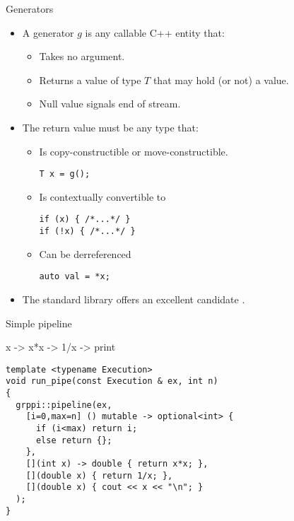 \begin{frame}[t,fragile]{Generators}
\begin{itemize}
  \item A generator $g$ is any callable C++ entity that:
    \begin{itemize}
      \item Takes no argument.
      \item Returns a value of type $T$ that may hold (or not) a value.
      \item Null value signals end of stream.
    \end{itemize}

  \vfill\pause
  \item The return value must be any type that:
    \begin{itemize}
      \item Is copy-constructible or move-constructible.
\begin{lstlisting}
T x = g();
\end{lstlisting}
      \pause
      \item Is contextually convertible to 
\begin{lstlisting}
if (x) { /*...*/ }
if (!x) { /*...*/ }
\end{lstlisting}
      \pause
      \item Can be derreferenced
\begin{lstlisting}
auto val = *x;
\end{lstlisting}
    \end{itemize}
  \vfill\pause
  \item The standard library offers an excellent candidate .
\end{itemize}
\end{frame}

\begin{frame}[t,fragile]{Simple pipeline}
\begin{block}{x -> x*x -> 1/x -> print}
\begin{lstlisting}
template <typename Execution>
void run_pipe(const Execution & ex, int n)
{
  grppi::pipeline(ex,
    [i=0,max=n] () mutable -> optional<int> {
      if (i<max) return i;
      else return {};
    },
    [](int x) -> double { return x*x; },
    [](double x) { return 1/x; },
    [](double x) { cout << x << "\n"; }
  );
}
\end{lstlisting}
\end{block}
\end{frame}

